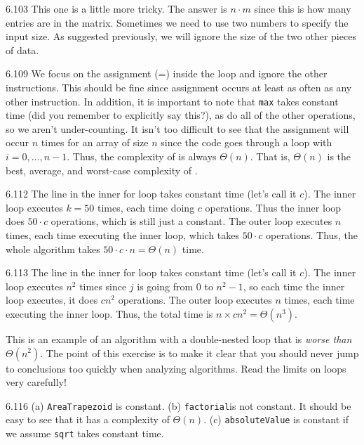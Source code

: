 \begin{Answer}{6.103}
This one is a little more tricky.
The answer is $n\cdot m$ since this is how many entries are in the matrix.
Sometimes we need to use two numbers to specify the input size.
As suggested previously, we will ignore the size of the two other pieces of data.
\end{Answer}
\begin{Answer}{6.109}
We focus on the assignment (=) inside the loop and ignore the other instructions.
This should be fine since assignment occurs at least as often as any other instruction.
In addition, it is important to note that \verb+max+ takes constant time
(did you remember to explicitly say this?),
as do all of the other operations, so we aren't under-counting.
It isn't too difficult to see that the assignment will occur $n$ times for an array of size $n$
since the code goes through a loop with $i=0,\ldots, n-1$.
Thus, the complexity of  is always $\Theta(n)$.  That is, $\Theta(n)$ is the best, average, and worst-case complexity of .
\end{Answer}
\begin{Answer}{6.112}
The line in the inner for loop takes constant time (let's call it $c$).
The inner loop executes $k=50$ times, each time doing $c$ operations.
Thus the inner loop does $50\cdot c$ operations, which is still just a constant.
The outer loop executes $n$ times, each time executing the inner loop, which takes $50\cdot c$ operations.
Thus, the whole algorithm takes $50\cdot c\cdot n=\Theta(n)$ time.
\end{Answer}
\begin{Answer}{6.113}
The line in the inner for loop takes constant time (let's call it $c$).
The inner loop executes $n^2$ times since $j$ is going from
$0$ to $n^2-1$, so each time the inner loop executes, it does $cn^2$ operations.
The outer loop executes $n$ times, each time executing the inner loop.
Thus, the total time is $n\times cn^2=\Theta(n^3)$.

This is an example of an algorithm with a double-nested loop
that is {\em worse than} $\Theta(n^2)$.  The point of this exercise is to make
it clear that you should never jump to conclusions too quickly when analyzing
algorithms.  Read the limits on loops very carefully!
\end{Answer}
\begin{Answer}{6.116}
(a) \verb+AreaTrapezoid+ is constant.
(b) \verb+factorial+is not constant.
It should be easy to see that it has a complexity of $\Theta(n)$.
(c)  \verb+absoluteValue+ is constant if we assume \verb+sqrt+ takes constant time.
\end{Answer}
